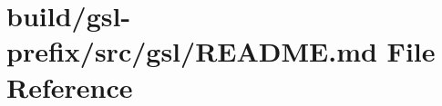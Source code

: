 \hypertarget{build_2gsl-prefix_2src_2gsl_2README_8md}{}\section{build/gsl-\/prefix/src/gsl/\+R\+E\+A\+D\+ME.md File Reference}
\label{build_2gsl-prefix_2src_2gsl_2README_8md}
